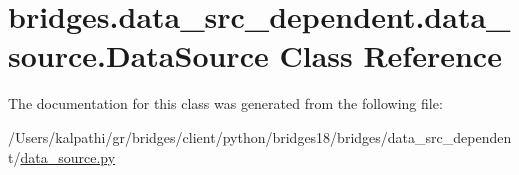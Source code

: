 \hypertarget{classbridges_1_1data__src__dependent_1_1data__source_1_1_data_source}{}\section{bridges.\+data\+\_\+src\+\_\+dependent.\+data\+\_\+source.\+Data\+Source Class Reference}
\label{classbridges_1_1data__src__dependent_1_1data__source_1_1_data_source}


The documentation for this class was generated from the following file\+:\begin{DoxyCompactItemize}
\item 
/\+Users/kalpathi/gr/bridges/client/python/bridges18/bridges/data\+\_\+src\+\_\+dependent/\mbox{\hyperlink{data__source_8py}{data\+\_\+source.\+py}}\end{DoxyCompactItemize}
